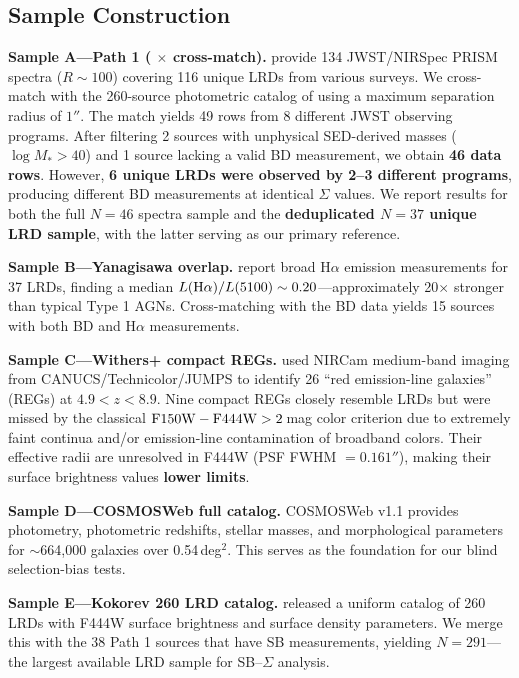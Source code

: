 \documentclass[twocolumn,linenumbers]{aastex631}
\begin{document}
\subsection{Sample Construction}

\textbf{Sample A---Path 1 (\citet{deGraaff2025} $\times$ \citet{Kokorev2024} cross-match).} \citet{deGraaff2025} provide 134 JWST/NIRSpec PRISM spectra ($R \sim 100$) covering 116 unique LRDs from various surveys. We cross-match with the 260-source photometric catalog of \citet{Kokorev2024} using a maximum separation radius of $1''$. The match yields 49 rows from 8 different JWST observing programs. After filtering 2 sources with unphysical SED-derived masses ($\log M_* > 40$) and 1 source lacking a valid BD measurement, we obtain \textbf{46 data rows}. However, \textbf{6 unique LRDs were observed by 2--3 different programs}, producing different BD measurements at identical $\Sigma$ values. We report results for both the full $N=46$ spectra sample and the \textbf{deduplicated $N=37$ unique LRD sample}, with the latter serving as our primary reference.

\textbf{Sample B---Yanagisawa overlap.} \citet{Yanagisawa2026} report broad H$\alpha$ emission measurements for 37 LRDs, finding a median $L({\rm H}\alpha)/L(5100) \sim 0.20$---approximately 20$\times$ stronger than typical Type 1 AGNs. Cross-matching with the \citet{deGraaff2025} BD data yields 15 sources with both BD and H$\alpha$ measurements.

\textbf{Sample C---Withers+ compact REGs.} \citet{Withers2026} used NIRCam medium-band imaging from CANUCS/Technicolor/JUMPS to identify 26 ``red emission-line galaxies'' (REGs) at $4.9 < z < 8.9$. Nine compact REGs closely resemble LRDs but were missed by the classical ${\rm F150W}-{\rm F444W} > 2$\,mag color criterion due to extremely faint continua and/or emission-line contamination of broadband colors. Their effective radii are unresolved in F444W (PSF FWHM $= 0.161''$), making their surface brightness values \textbf{lower limits}.

\textbf{Sample D---COSMOSWeb full catalog.} COSMOSWeb v1.1 \citep{COSMOSWeb} provides photometry, photometric redshifts, stellar masses, and morphological parameters for $\sim$664,000 galaxies over 0.54\,deg$^2$. This serves as the foundation for our blind selection-bias tests.

\textbf{Sample E---Kokorev 260 LRD catalog.} \citet{Kokorev2024} released a uniform catalog of 260 LRDs with F444W surface brightness and surface density parameters. We merge this with the 38 Path 1 sources that have SB measurements, yielding \textbf{$N = 291$}---the largest available LRD sample for SB--$\Sigma$ analysis.
\end{document}
